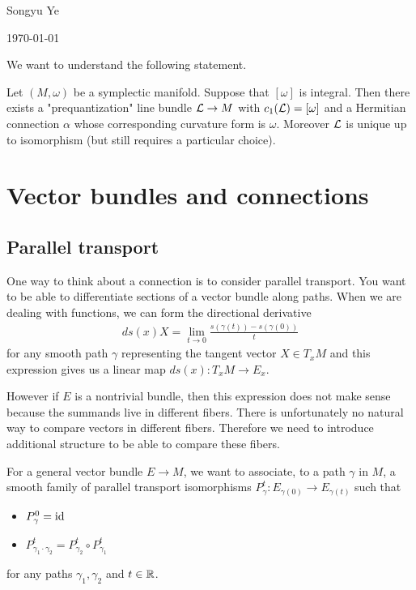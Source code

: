 \documentclass[12pt]{article}
\begin{document}
Songyu Ye

\today

\hfill

We want to understand the following statement.

\begin{theorem}
    Let $(M,\omega)$ be a symplectic manifold. Suppose that $[\omega]$ is integral. Then 
there exists a "prequantization" line bundle ${\mathcal{L}} \to M$ with $c_1({\mathcal{L}}) = [\omega]$ and a Hermitian connection $\alpha$
whose corresponding curvature form is $\omega$. Moreover ${\mathcal{L}}$ is unique up to isomorphism 
(but still requires a particular choice). 
\end{theorem}

\section{Vector bundles and connections}
\subsection{Parallel transport}
One way to think about a connection is to consider parallel transport. You want to 
be able to differentiate sections of a vector bundle along paths. When we are dealing with functions,
we can form the directional derivative  \begin{align*}
    ds(x)X = \lim_{t\to 0}\frac{s(\gamma(t)) - s(\gamma(0))}{t}
\end{align*} for any smooth path $\gamma$ representing the tangent vector $X\in T_xM$ 
and this expression gives us a linear map $ds(x):T_xM\to E_x$.

\hfill 

However if $E$ is a nontrivial bundle, then this expression does not make sense because the
 summands live in different fibers. There is unfortunately no natural way to 
 compare vectors in different fibers. Therefore we need to introduce additional structure to 
 be able to compare these fibers.


\hfill

For a general vector bundle $E\to M$, we want to associate, to a path $\gamma$ in $M$, a smooth family of 
parallel transport isomorphisms $P^t_\gamma: E_{\gamma(0)}\to E_{\gamma(t)}$ such that \begin{itemize}
    \item $P^0_\gamma = \operatorname{id}$
    \item $P^t_{\gamma_1\cdot\gamma_2} = P^t_{\gamma_2}\circ P^t_{\gamma_1}$
\end{itemize} for any paths $\gamma_1,\gamma_2$ and $t\in\mathbb{R}$.
\end{document}
